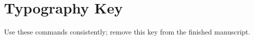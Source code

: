 \section{Typography Key}
\label{app:style}
Use these commands consistently; remove this key from the finished manuscript.

